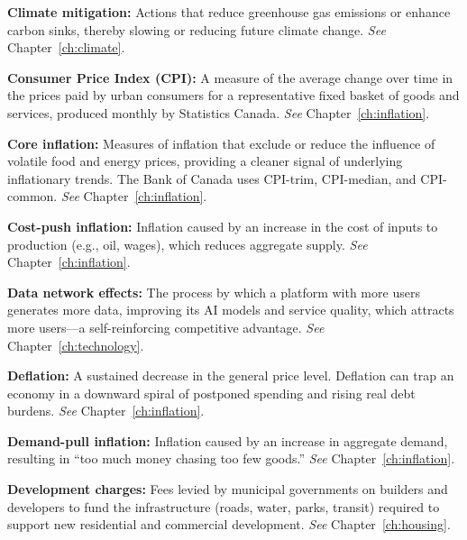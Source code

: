 \vspace{6pt}
\noindent\textbf{Climate mitigation:} Actions that reduce greenhouse gas emissions or enhance carbon sinks, thereby slowing or reducing future climate change. \textit{See} Chapter~\ref{ch:climate}.

\vspace{6pt}
\noindent\textbf{Consumer Price Index (CPI):} A measure of the average change over time in the prices paid by urban consumers for a representative fixed basket of goods and services, produced monthly by Statistics Canada. \textit{See} Chapter~\ref{ch:inflation}.

\vspace{6pt}
\noindent\textbf{Core inflation:} Measures of inflation that exclude or reduce the influence of volatile food and energy prices, providing a cleaner signal of underlying inflationary trends. The Bank of Canada uses CPI-trim, CPI-median, and CPI-common. \textit{See} Chapter~\ref{ch:inflation}.

\vspace{6pt}
\noindent\textbf{Cost-push inflation:} Inflation caused by an increase in the cost of inputs to production (e.g., oil, wages), which reduces aggregate supply. \textit{See} Chapter~\ref{ch:inflation}.

\vspace{6pt}
\noindent\textbf{Data network effects:} The process by which a platform with more users generates more data, improving its AI models and service quality, which attracts more users---a self-reinforcing competitive advantage. \textit{See} Chapter~\ref{ch:technology}.

\vspace{6pt}
\noindent\textbf{Deflation:} A sustained decrease in the general price level. Deflation can trap an economy in a downward spiral of postponed spending and rising real debt burdens. \textit{See} Chapter~\ref{ch:inflation}.

\vspace{6pt}
\noindent\textbf{Demand-pull inflation:} Inflation caused by an increase in aggregate demand, resulting in ``too much money chasing too few goods.'' \textit{See} Chapter~\ref{ch:inflation}.

\vspace{6pt}
\noindent\textbf{Development charges:} Fees levied by municipal governments on builders and developers to fund the infrastructure (roads, water, parks, transit) required to support new residential and commercial development. \textit{See} Chapter~\ref{ch:housing}.

